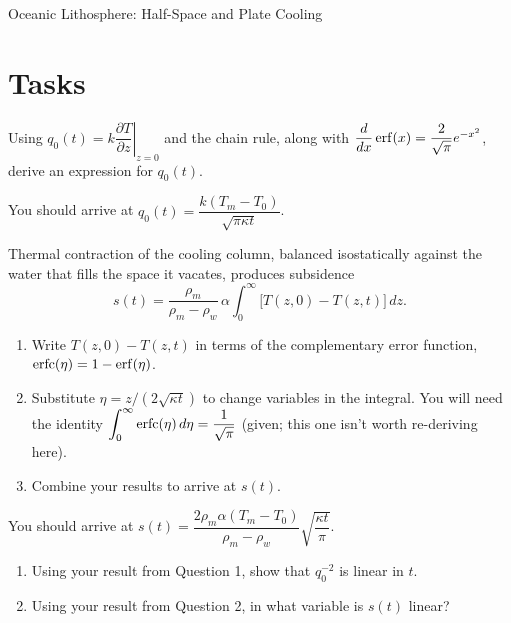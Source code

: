 \begin{activity}{Oceanic Lithosphere: Half-Space and Plate Cooling}
\section*{Tasks}
\begin{questions}


Using $q_0(t) = k\left.\dfrac{\partial T}{\partial z}\right|_{z=0}$ and the chain rule, along with $\dfrac{d}{dx}\erf(x) = \dfrac{2}{\sqrt\pi}e^{-x^2}$, derive an expression for $q_0(t)$.

\answerbox[4cm]

You should arrive at $q_0(t) = \dfrac{k(T_m-T_0)}{\sqrt{\pi\kappa t}}$.


Thermal contraction of the cooling column, balanced isostatically against the water that fills the space it vacates, produces subsidence
\[
s(t) = \frac{\rho_m}{\rho_m-\rho_w}\,\alpha\int_0^\infty\bigl[T(z,0)-T(z,t)\bigr]\,dz.
\]

\begin{enumerate}[label=(\alph*)]
    \item Write $T(z,0)-T(z,t)$ in terms of the complementary error function, $\erfc(\eta)=1-\erf(\eta)$.
    \answerbox[2cm]

    \item Substitute $\eta=z/(2\sqrt{\kappa t})$ to change variables in the integral. You will need the identity $\displaystyle\int_0^\infty \operatorname{erfc}(\eta)\,d\eta = \frac{1}{\sqrt\pi}$ (given; this one isn't worth re-deriving here).
    \answerbox[3cm]

    \item Combine your results to arrive at $s(t)$.
    \answerbox[2cm]
\end{enumerate}

You should arrive at $s(t) = \dfrac{2\rho_m\alpha(T_m-T_0)}{\rho_m-\rho_w}\sqrt{\dfrac{\kappa t}{\pi}}$.


\begin{enumerate}[label=(\alph*)]
    \item Using your result from Question 1, show that $q_0^{-2}$ is linear in $t$.
    \answerbox[2.5cm]

    \item Using your result from Question 2, in what variable is $s(t)$ linear?
    \answerbox[1.5cm]
\end{enumerate}


\end{questions}
\end{activity}

